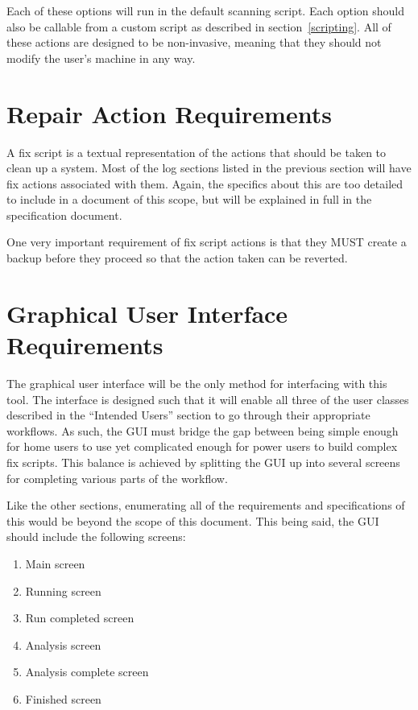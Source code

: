 \documentclass[letterpaper,12pt]{article}
\begin{document}
Each of these options will run in the default scanning script.  Each option
should also be callable from a custom script as described in
section~\ref{scripting}.  All of these actions are designed to be non-invasive,
meaning that they should not modify the user's machine in any way.

\newpage



\section{Repair Action Requirements} \label{repair}
A fix script is a textual representation of the actions that should be taken to
clean up a system.  Most of the log sections listed in the previous section will
have fix actions associated with them.  Again, the specifics about this are too
detailed to include in a document of this scope, but will be explained in full
in the specification document.

One very important requirement of fix script actions is that they MUST create a
backup before they proceed so that the action taken can be reverted.  

\newpage



\section{Graphical User Interface Requirements} \label{gui}
The graphical user interface will be the only method for interfacing with this
tool.  The interface is designed such that it will enable all three of the user
classes described in the ``Intended Users'' section to go through their
appropriate workflows.  As such, the GUI must bridge the gap between being
simple enough for home users to use yet complicated enough for power users to
build complex fix scripts.  This balance is achieved by splitting the GUI up
into several screens for completing various parts of the workflow.

Like the other sections, enumerating all of the requirements and specifications
of this would be beyond the scope of this document.  This being said, the GUI
should include the following screens:

\begin{enumerate}
  \item Main screen
  \item Running screen
  \item Run completed screen
  \item Analysis screen
  \item Analysis complete screen
  \item Finished screen
\end{enumerate}
\end{document}
